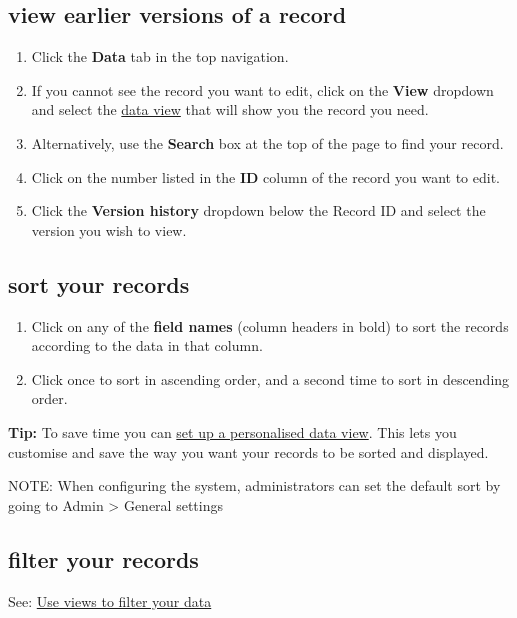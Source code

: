 \documentclass{ctrlo-int-toc}
\begin{document}
\subsection[view earlier versions of a record]{view earlier versions of a record}
\begin{enumerate}
\item Click the \textbf{Data} tab in the top navigation.
\item If you cannot see the record you want to edit, click on the \textbf{View} dropdown and select the \hyperref[sec:views]{data view} that will show you the record you need.
\item Alternatively, use the \textbf{Search} box at the top of the page to find your record.
\item Click on the number listed in the \textbf{ID} column of the record you want to edit.
\item Click the \textbf{Version history} dropdown below the Record ID and select the version you wish to view. \ 
\end{enumerate}
\subsection[sort your records]{sort your records}
\begin{enumerate}
\item Click on any of the \textbf{field names} (column headers in bold) to sort the records according to the data in that column. 
\item Click once to sort in ascending order, and a second time to sort in descending order.
\end{enumerate}
\begin{tipbox}[userdefinedwidth=15cm]
    \textbf{Tip:} To save time you can \hyperref[subsec:personalview]{set up a personalised data view}. This lets you customise and save the way you want your records to be sorted and displayed.
\end{tipbox}

\begin{notebox}
NOTE: When configuring the system, administrators can set the default sort by going to Admin {\textgreater} General settings
\end{notebox}

\subsection[filter your records ]{filter your records }
See: \hyperref[subsec:viewstofilter]{Use views to filter your data}
\end{document}
